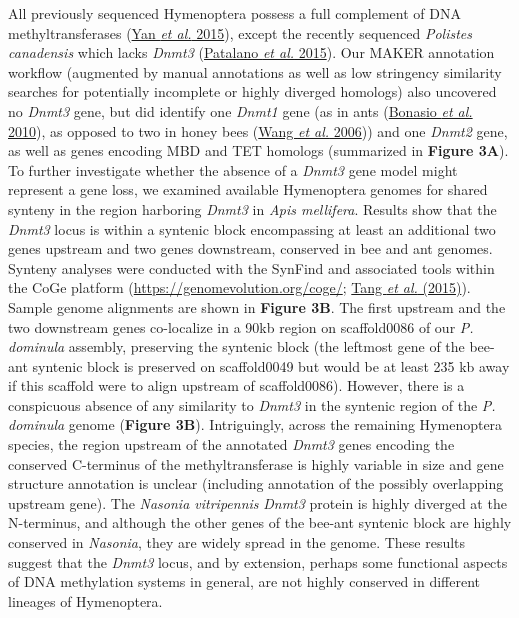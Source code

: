 All previously sequenced Hymenoptera possess a full complement of DNA
methyltransferases (\protect\hyperlink{ux5fENREFux5f75}{Yan \textit{et
al.} 2015}), except the recently sequenced \textit{Polistes canadensis}
which lacks \textit{Dnmt3} (\protect\hyperlink{ux5fENREFux5f43}{Patalano
\textit{et al.} 2015}). Our MAKER annotation workflow (augmented by manual
annotations as well as low stringency similarity searches for
potentially incomplete or highly diverged homologs) also uncovered no
\textit{Dnmt3} gene, but did identify one \textit{Dnmt1} gene (as in ants
(\protect\hyperlink{ux5fENREFux5f5}{Bonasio \textit{et al.} 2010}), as
opposed to two in honey bees (\protect\hyperlink{ux5fENREFux5f66}{Wang
\textit{et al.} 2006})) and one \textit{Dnmt2} gene, as well as genes
encoding MBD and TET homologs (summarized in \textbf{Figure 3A}). To
further investigate whether the absence of a \textit{Dnmt3} gene model
might represent a gene loss, we examined available Hymenoptera genomes
for shared synteny in the region harboring \textit{Dnmt3} in \textit{Apis
mellifera}. Results show that the \textit{Dnmt3} locus is within a
syntenic block encompassing at least an additional two genes upstream
and two genes downstream, conserved in bee and ant genomes. Synteny
analyses were conducted with the SynFind and associated tools within the
CoGe platform (\url{https://genomevolution.org/coge/};
\protect\hyperlink{ux5fENREFux5f60}{Tang \textit{et al.} (2015)}). Sample
genome alignments are shown in \textbf{Figure 3B}. The first upstream
and the two downstream genes co-localize in a 90kb region on
scaffold0086 of our \textit{P. dominula} assembly, preserving the syntenic
block (the leftmost gene of the bee-ant syntenic block is preserved on
scaffold0049 but would be at least 235 kb away if this scaffold were to
align upstream of scaffold0086). However, there is a conspicuous absence
of any similarity to \textit{Dnmt3} in the syntenic region of the \textit{P.
dominula} genome (\textbf{Figure 3B}). Intriguingly, across the
remaining Hymenoptera species, the region upstream of the annotated
\textit{Dnmt3} genes encoding the conserved C-terminus of the
methyltransferase is highly variable in size and gene structure
annotation is unclear (including annotation of the possibly overlapping
upstream gene). The \textit{Nasonia vitripennis} \textit{Dnmt3} protein is
highly diverged at the N-terminus, and although the other genes of the
bee-ant syntenic block are highly conserved in \textit{Nasonia}, they are
widely spread in the genome. These results suggest that the \textit{Dnmt3}
locus, and by extension, perhaps some functional aspects of DNA
methylation systems in general, are not highly conserved in different
lineages of Hymenoptera.

